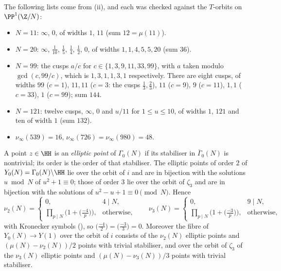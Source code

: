 \begin{example}\label{ex:modforms:cusp-lists}
The following lists come from (ii), and each was checked against the $T$-orbits on $\PP^1(\Z/N)$:
\begin{itemize}
\item $N=11$: $\infty$, $0$, of widths $1$, $11$ (sum $12=\mu(11)$).
\item $N=20$: $\infty$, $\frac1{10}$, $\frac15$, $\frac14$, $\frac12$, $0$, of widths $1,1,4,5,5,20$ (sum $36$).
\item $N=99$: the cusps $a/c$ for $c\in\{1,3,9,11,33,99\}$, with $a$ taken modulo $\gcd(c,99/c)$, which is $1,3,1,1,3,1$ respectively. There are eight cusps, of widths $99$ ($c=1$), $11,11$ ($c=3$: the cusps
$\frac13,\frac23$), $11$ ($c=9$), $9$ ($c=11$), $1,1$ ($c=33$), $1$ ($c=99$); sum $144$.
\item $N=121$: twelve cusps, $\infty$, $0$ and $u/11$ for $1\le u\le10$, of widths $1$, $121$ and ten of width $1$ (sum $132$).
\item $\nu_\infty(539)=16$, $\nu_\infty(726)=\nu_\infty(980)=48$.
\end{itemize}
\end{example}

\begin{proposition}\label{prop:modforms:elliptic-gamma0}
A point $z\in\HH$ is an \emph{elliptic point} of $\Gamma_0(N)$ if its stabiliser in $\bar\Gamma_0(N)$ is nontrivial; its order is the order of that stabiliser. The
elliptic points of order $2$ of $Y_0(N)=\Gamma_0(N)\backslash\HH$ lie over the orbit of $i$ and are in bijection with the solutions $u\bmod N$ of $u^2+1\equiv0$; those of order $3$
lie over the orbit of $\zeta_3$ and are in bijection with the solutions of $u^2-u+1\equiv0\pmod N$. Hence
\[
\nu_2(N)=\begin{cases}0,&4\mid N,\\ \prod_{p\mid N}\bigl(1+\bigl(\frac{-4}p\bigr)\bigr),&\text{otherwise},\end{cases}\qquad
\nu_3(N)=\begin{cases}0,&9\mid N,\\ \prod_{p\mid N}\bigl(1+\bigl(\frac{-3}p\bigr)\bigr),&\text{otherwise},\end{cases}
\]
with Kronecker symbols (), so $\bigl(\frac{-4}2\bigr)=\bigl(\frac{-3}3\bigr)=0$. Moreover the fibre of $Y_0(N)\to Y(1)$ over the orbit of $i$ consists of the $\nu_2(N)$
elliptic points and $(\mu(N)-\nu_2(N))/2$ points with trivial stabiliser, and over the orbit of $\zeta_3$ of the $\nu_3(N)$ elliptic points and $(\mu(N)-\nu_3(N))/3$
points with trivial stabiliser.
\end{proposition}

